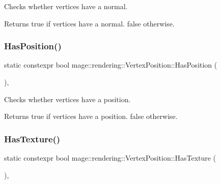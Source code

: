 Checks whether vertices have a normal.

\begin{DoxyReturn}{Returns}
{\ttfamily true} if vertices have a normal. {\ttfamily false} otherwise. 
\end{DoxyReturn}
\mbox{\label{structmage_1_1rendering_1_1_vertex_position_a23134a6f43a36f72f94ec6dba3024503}} 
\subsubsection{\texorpdfstring{Has\+Position()}{HasPosition()}}
{\footnotesize\ttfamily static constexpr bool mage\+::rendering\+::\+Vertex\+Position\+::\+Has\+Position (\begin{DoxyParamCaption}{ }\end{DoxyParamCaption})\hspace{0.3cm}{\ttfamily [static]}, {\ttfamily [noexcept]}}

Checks whether vertices have a position.

\begin{DoxyReturn}{Returns}
{\ttfamily true} if vertices have a position. {\ttfamily false} otherwise. 
\end{DoxyReturn}
\mbox{\label{structmage_1_1rendering_1_1_vertex_position_aac518715cc922a0094261f075f8ae80b}} 
\subsubsection{\texorpdfstring{Has\+Texture()}{HasTexture()}}
{\footnotesize\ttfamily static constexpr bool mage\+::rendering\+::\+Vertex\+Position\+::\+Has\+Texture (\begin{DoxyParamCaption}{ }\end{DoxyParamCaption})\hspace{0.3cm}{\ttfamily [static]}, {\ttfamily [noexcept]}}

